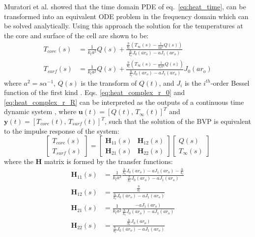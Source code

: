 \documentclass[journal, english]{IEEEtran}
\begin{document}
Muratori et al. \cite{Muratori2010a} showed that the time domain PDE of
eq.\ \ref{eq:heat_time}, can be transformed into an equivalent ODE
problem in the frequency domain which can be solved analytically.
Using this approach the solution for the temperatures at the core and surface of the cell are shown to be:
\begin{align}
T_{core}(s) & =\frac{1}{k_t a^{2}}Q(s)+\frac{\frac{h}{k_{t}}(T_{\infty}(s)-\frac{1}{ka^{2}}Q(s))}{\frac{h}{k_{t}}J_{0}(ar_{o})-aJ_{1}(ar_{o})}\label{eq:heat_complex_r_0}\\
T_{surf}(s) & =\frac{1}{k_t a^{2}}Q(s)+\frac{\frac{h}{k_{t}}(T_{\infty}(s)-\frac{1}{k_{t}a^{2}}Q(s))}{\frac{h}{k_{t}}J_{0}(ar_{o})-aJ_{1}(ar_{o})}J_{0}(ar_{o})\label{eq:heat_complex_r_R}
\end{align}
where $a^{2}=s\alpha^{-1}$, $Q(s)$ is the transform of $Q(t)$,
and $J_{i}$ is the $i^{th}$-order Bessel function of the first kind \cite{Kreyszig2010}. Eqs. \ref{eq:heat_complex_r_0} and \ref{eq:heat_complex_r_R} can be interpreted as the outputs of a continuous time dynamic system \cite{Muratori2010a}, where $\mathbf{u}(t)=[Q(t),\, T_{\infty}(t)]^{T}$ and $\mathbf{y}(t)=[T_{core}(t),\, T_{surf}(t)]^{T}$,
such that the solution of the BVP is equivalent to the impulse response
of the system:
\begin{equation}
\begin{bmatrix}T_{core}(s)\\
T_{surf}(s)
\end{bmatrix}=\begin{bmatrix}\mathbf{H}_{11}(s) & \mathbf{H}_{12}(s)\\
\mathbf{H}_{21}(s) & \mathbf{H}_{22}(s)
\end{bmatrix}\begin{bmatrix}Q(s)\\
T_{\infty}(s)
\end{bmatrix}
\end{equation}
where the $\mathbf{H}$ matrix is formed by the transfer functions:
\begin{align}
\mathbf{H}_{11}(s) & =\frac{1}{k_{t} a^2}\frac{\frac{h}{k_{t}}J_{0}(a r_o)-aJ_{1}(ar_o)-\frac{h}{k_{t}}}{\frac{h}{k_{t}}J_{0}(ar_o)-aJ_{1}(ar_o)}\\
\mathbf{H}_{12}(s) & =\frac{\frac{h}{k_{t}}}{\frac{h}{k_{t}}J_{0}(ar_o)-aJ_{1}(ar_o)}\\
\mathbf{H}_{21}(s) & =\frac{1}{k_{t}a^2}\frac{-aJ_{1}(ar_o)}{\frac{h}{k_{t}}J_{0}(ar_o)-aJ_{1}(ar_o)}\\
\mathbf{H}_{22}(s) & =\frac{\frac{h}{k_{t}}J_{0}(ar_o)}{\frac{h}{k_{t}}J_{0}(ar_o)-aJ_{1}(ar_o)}
\end{align}
\end{document}
